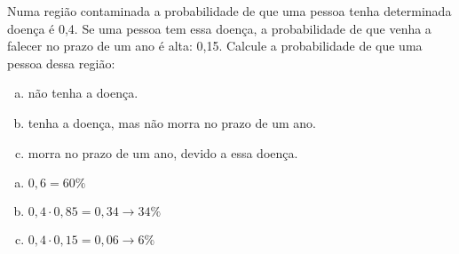 \begin{ex}
Numa região contaminada a probabilidade de que uma pessoa tenha determinada doença é 0,4. Se uma pessoa tem essa doença, a probabilidade de que venha a falecer no prazo de um ano é alta: 0,15. Calcule a probabilidade de que uma pessoa dessa região:
   \begin{enumerate}[(a)]
   \item não tenha a doença.
   \item tenha a doença,  mas não morra no prazo de um ano.
   \item morra no prazo de um ano, devido a essa doença.
   \end{enumerate}
    \begin{sol}
     \phantom{A} 
      \begin{enumerate} [(a)]
          \item $0,6 = 60\%$
          \item $0,4\cdot0,85=0,34\rightarrow34\%$
          \item $0,4\cdot0,15=0,06\rightarrow6\%$
      \end{enumerate}
       
    \end{sol}
\end{ex}